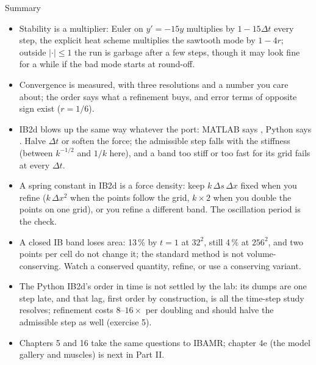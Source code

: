 \documentclass[aspectratio=169,11pt]{beamer}
\begin{document}
\begin{frame}{Summary}
\label{fr:summary}
\footnotesize
\begin{itemize}
  \item Stability is a multiplier: Euler on $y' = -15y$ multiplies by $1 - 15\Delta t$ every step, the explicit heat scheme multiplies the sawtooth mode by $1 - 4r$; outside $|{\cdot}| \le 1$ the run is garbage after a few steps, though it may look fine for a while if the bad mode starts at round-off.
  \item Convergence is measured, with three resolutions and a number you care about; the order says what a refinement buys, and error terms of opposite sign exist ($r = 1/6$).
  \item IB2d blows up the same way whatever the port: MATLAB says , Python says . Halve $\Delta t$ or soften the force; the admissible step falls with the stiffness (between $k^{-1/2}$ and $1/k$ here), and a band too stiff or too fast for its grid fails at every $\Delta t$.
  \item A spring constant in IB2d is a force density: keep $k\,\Delta s\,\Delta x$ fixed when you refine ($k\,\Delta x^2$ when the points follow the grid, $k \times 2$ when you double the points on one grid), or you refine a different band. The oscillation period is the check.
  \item A closed IB band loses area: 13\,\% by $t = 1$ at $32^2$, still 4\,\% at $256^2$, and two points per cell do not change it; the standard method is not volume-conserving. Watch a conserved quantity, refine, or use a conserving variant.
  \item The Python IB2d's order in time is not settled by the lab: its dumps are one step late, and that lag, first order by construction, is all the time-step study resolves; refinement costs $8$--$16\times$ per doubling and should halve the admissible step as well (exercise 5).
  \item Chapters 5 and 16 take the same questions to IBAMR; chapter 4e (the model gallery and muscles) is next in Part II.
\end{itemize}
\end{frame}
\end{document}
